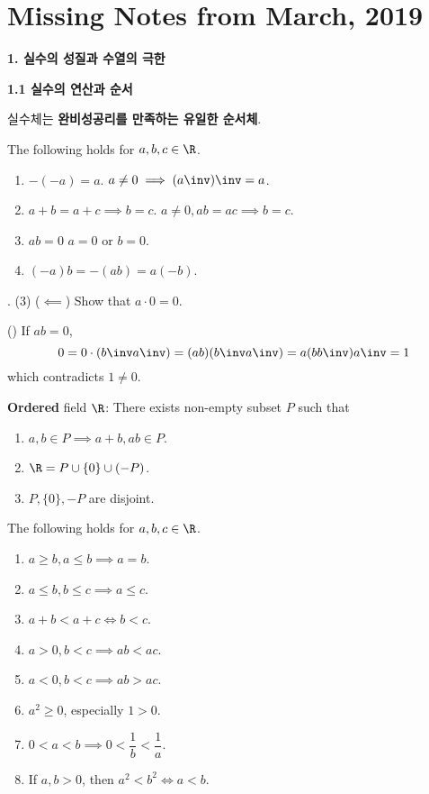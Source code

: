 \section*{Missing Notes from March, 2019}

\textbf{\large 1. 실수의 성질과 수열의 극한}

\medskip

\noindent \textbf{1.1 실수의 연산과 순서}

\medskip

\noindent 실수체는 \textbf{완비성공리를 만족하는 유일한 순서체}.

\medskip

\noindent {} The following holds for \(a, b, c \in \R\).
\begin{enumerate}
    \item \(-(-a) = a\). \(a \neq 0 \implies (a \inv)\inv = a\).
    \item \(a + b = a + c \implies b = c\). \(a \neq 0, ab = ac \implies b = c\).
    \item \(ab = 0\) \miff \(a = 0\) or \(b = 0\).
    \item \((-a)b = -(ab) = a(-b)\).
\end{enumerate}

\medskip

\noindent \pf. (3) (\(\impliedby\)) Show that \(a \cdot 0 = 0\).

\noindent (\mimp) If \(ab = 0\),
\[
    0 = 0 \cdot (b\inv a\inv) = (ab)(b\inv a\inv) = a(bb\inv)a\inv = 1
\]
which contradicts \(1 \neq 0\).

\bigskip

\noindent \textbf{Ordered} field \(\R\): There exists non-empty subset \(P\) such that
\begin{enumerate}
    \item \(a, b \in P \implies a + b, ab \in P\).
    \item \(\R = P \cup \{0\} \cup (-P)\).
    \item \(P, \{0\}, -P\) are disjoint.
\end{enumerate}

\bigskip

\noindent {} The following holds for \(a, b, c \in \R\).
\begin{enumerate}
    \item \(a \geq b, a \leq b \implies a = b\).
    \item \(a \leq b, b \leq c \implies a \leq c\).
    \item \(a + b < a+ c \iff b < c\).
    \item \(a > 0, b < c \implies ab < ac\).
    \item \(a < 0, b < c \implies ab > ac\).
    \item \(a^2 \geq 0\), especially \(1 > 0\).
    \item \(0 < a < b \implies 0 < \dfrac{1}{b} < \dfrac{1}{a}\).
    \item If \(a, b > 0\), then \(a^2 < b^2 \iff a < b\).
\end{enumerate}


